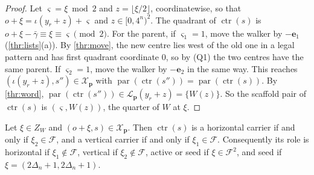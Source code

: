\begin{proof}
Let $\varsigma=\xi\bmod2$ and $z=\lfloor\xi/2\rfloor$, coordinatewise, so that $o+\xi=\iota(y_r+z)+\varsigma$ and $z\in[0,4^n)^2$. The quadrant of $\operatorname{ctr}(s)$ is $o+\xi-\bar\gamma\equiv\xi\equiv\varsigma\pmod2$. For the parent, if $\varsigma_1=1$, move the walker by $-\mathbf e_1$ (\cref{thr:lists}(a)). By \cref{thr:move}, the new centre lies west of the old one in a legal pattern and has first quadrant coordinate $0$, so by (Q1) the two centres have the same parent. If $\varsigma_2=1$, move the walker by $-\mathbf e_2$ in the same way. This reaches $(\iota(y_r+z),s'')\in\mathcal X_{\mathbf p}$ with $\operatorname{par}(\operatorname{ctr}(s''))=\operatorname{par}(\operatorname{ctr}(s))$. By \cref{thr:word}, $\operatorname{par}(\operatorname{ctr}(s''))\in\mathcal L_{\mathbf p}(y_r+z)=\{W(z)\}$. So the scaffold pair of $\operatorname{ctr}(s)$ is $(\varsigma,W(z))$, the quarter of $W$ at $\xi$.
\end{proof}

\begin{lemma}[Corridors]\label{thr:roles}
Let $\xi\in Z_W$ and $(o+\xi,s)\in\mathcal X_{\mathbf p}$. Then $\operatorname{ctr}(s)$ is a horizontal carrier if and only if $\xi_2\in\mathcal F$, and a vertical carrier if and only if $\xi_1\in\mathcal F$. Consequently its role is horizontal if $\xi_1\notin\mathcal F$, vertical if $\xi_2\notin\mathcal F$, active or seed if $\xi\in\mathcal F^2$, and seed if $\xi=(2\Delta_n+1,2\Delta_n+1)$.
\end{lemma}

